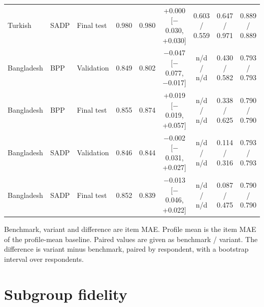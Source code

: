 \begin{table}[pos=!htbp]
\begin{tabular*}{\textwidth}{@{\extracolsep{\fill}}lllcccccc@{}}
Turkish & SADP & Final test & 0.980 & 0.980 & +0.000 [$-$0.030, +0.030] & 0.603 / 0.559 & 0.647 / 0.971 & 0.889 / 0.889 \\
Bangladesh & BPP & Validation & 0.849 & 0.802 & $-$0.047 [$-$0.077, $-$0.017] & n/d / n/d & 0.430 / 0.582 & 0.793 / 0.793 \\
Bangladesh & BPP & Final test & 0.855 & 0.874 & +0.019 [$-$0.019, +0.057] & n/d / n/d & 0.338 / 0.625 & 0.790 / 0.790 \\
Bangladesh & SADP & Validation & 0.846 & 0.844 & $-$0.002 [$-$0.031, +0.027] & n/d / n/d & 0.114 / 0.316 & 0.793 / 0.793 \\
Bangladesh & SADP & Final test & 0.852 & 0.839 & $-$0.013 [$-$0.046, +0.022] & n/d / n/d & 0.087 / 0.475 & 0.790 / 0.790 \\
\bottomrule
\end{tabular*}
\par\smallskip
\scriptsize Benchmark, variant and difference are item MAE. Profile mean is the item MAE of the profile-mean baseline. Paired values are given as benchmark / variant. The difference is variant minus benchmark, paired by respondent, with a bootstrap interval over respondents.
\end{table}

\clearpage

\section{Subgroup fidelity}
\label{app:g}

